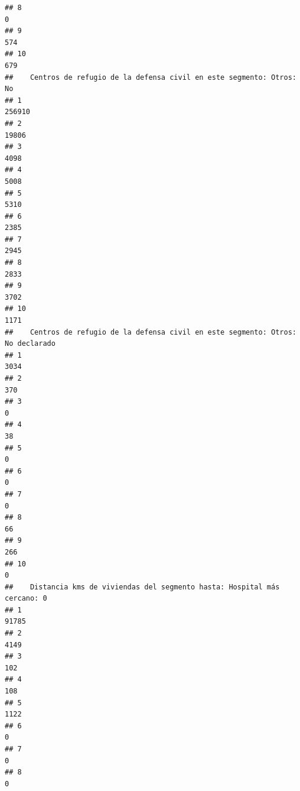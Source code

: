 \documentclass[11pt,]{article}
\begin{document}
\begin{verbatim}
## 8                                                                   0
## 9                                                                 574
## 10                                                                679
##    Centros de refugio de la defensa civil en este segmento: Otros: No
## 1                                                              256910
## 2                                                               19806
## 3                                                                4098
## 4                                                                5008
## 5                                                                5310
## 6                                                                2385
## 7                                                                2945
## 8                                                                2833
## 9                                                                3702
## 10                                                               1171
##    Centros de refugio de la defensa civil en este segmento: Otros: No declarado
## 1                                                                          3034
## 2                                                                           370
## 3                                                                             0
## 4                                                                            38
## 5                                                                             0
## 6                                                                             0
## 7                                                                             0
## 8                                                                            66
## 9                                                                           266
## 10                                                                            0
##    Distancia kms de viviendas del segmento hasta: Hospital más cercano: 0
## 1                                                                   91785
## 2                                                                    4149
## 3                                                                     102
## 4                                                                     108
## 5                                                                    1122
## 6                                                                       0
## 7                                                                       0
## 8                                                                       0

\end{verbatim}
\end{document}
